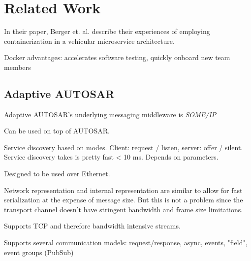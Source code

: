\chapter{Related Work}\label{chapter:related-work}


In their paper, Berger et. al. \cite{berger2017containerized} describe their experiences of employing containerization in a vehicular microservice architecture. 

Docker advantages: accelerates software testing, quickly onboard new team members


\section{Adaptive AUTOSAR}

Adaptive AUTOSAR's underlying messaging middleware is \emph{SOME/IP}

Can be used on top of AUTOSAR.

Service discovery based on modes. Client: request / listen, server: offer / silent.
Service discovery takes is pretty fast < 10 ms. Depends on parameters.

Designed to be used over Ethernet.

Network representation and internal representation are similar to allow for fast serialization at the expense of message size. But this is not a problem since the transport channel doesn't have stringent bandwidth and frame size limitations.

Supports TCP and therefore bandwidth intensive streams.

Supports several communication models: request/response, async, events, "field", event groups (PubSub)